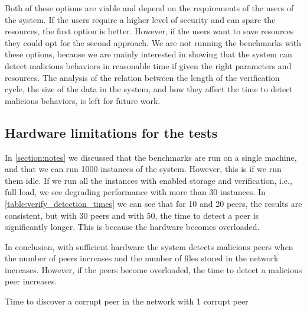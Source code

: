 Both of these options are viable and depend on the requirements of the users of the system.
If the users require a higher level of security and can spare the resources,
the first option is better.
However, if the users want to save resources they could opt for the second approach.
We are not running the benchmarks with these options, because we are mainly interested in
showing that the system can detect malicious behaviors in reasonable time if given the right parameters
and resources.
The analysis of the relation between the length of the verification cycle, the size of the data in the system,
and how they affect the time to detect malicious behaviors, is left for future work.

\subsection{Hardware limitations for the tests}

In \autoref{section:notes} we discussed that the benchmarks are run on a single machine,
and that we can run 1000 instances of the system.
However, this is if we run them idle.
If we run all the instances with enabled storage and verification, i.e., full load,
we see degrading performance with more than 30 instances.
In \autoref{table:verify_detection_times} we can see that for 10 and 20 peers,
the results are consistent, but with 30 peers and with 50, the time to detect a peer is significantly longer.
This is because the hardware becomes overloaded.

In conclusion, with sufficient hardware the system detects malicious peers when the number of peers
increases and the number of files stored in the network increases.
However, if the peers become overloaded, the time to detect a malicious peer increases.

\begin{table}
  \myfloatalign
  \caption{Time to discover a corrupt peer in the network with 1 corrupt peer}
  \label{table:verify_detection_times}
\end{table}

